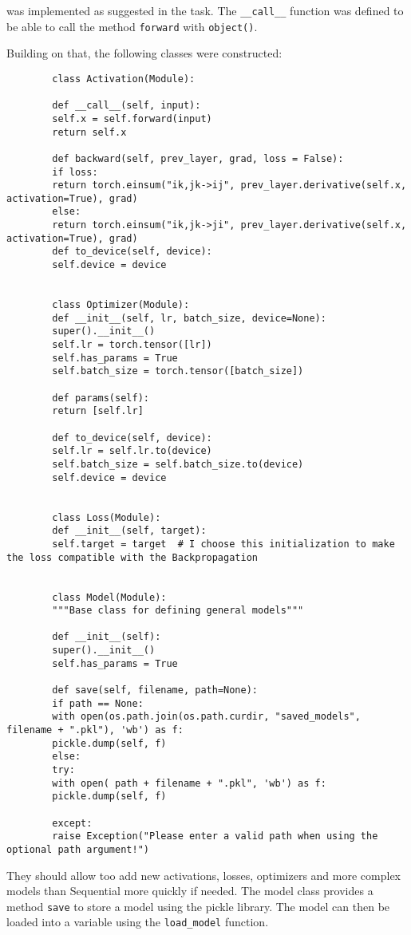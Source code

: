 \documentclass[11pt,english]{article}
\begin{document}
	was implemented as suggested in the task. The \lstinline|__call__| function was defined to be able to call the method \lstinline|forward| with \lstinline|object()|.
	
	Building on that, the following classes were constructed: 
	
	\begin{lstlisting}
		class Activation(Module):
		
		def __call__(self, input):
		self.x = self.forward(input)
		return self.x
		
		def backward(self, prev_layer, grad, loss = False):
		if loss:
		return torch.einsum("ik,jk->ij", prev_layer.derivative(self.x, activation=True), grad) 
		else:
		return torch.einsum("ik,jk->ji", prev_layer.derivative(self.x, activation=True), grad) 
		def to_device(self, device):
		self.device = device
		
		
		class Optimizer(Module):
		def __init__(self, lr, batch_size, device=None):
		super().__init__()
		self.lr = torch.tensor([lr])
		self.has_params = True
		self.batch_size = torch.tensor([batch_size])
		
		def params(self):
		return [self.lr]
		
		def to_device(self, device):
		self.lr = self.lr.to(device)
		self.batch_size = self.batch_size.to(device)
		self.device = device
	
	
		class Loss(Module):
		def __init__(self, target):
		self.target = target  # I choose this initialization to make the loss compatible with the Backpropagation 
	
	
		class Model(Module):
		"""Base class for defining general models"""
		
		def __init__(self):
		super().__init__()
		self.has_params = True
		
		def save(self, filename, path=None):
		if path == None:
		with open(os.path.join(os.path.curdir, "saved_models", filename + ".pkl"), 'wb') as f:
		pickle.dump(self, f)
		else:
		try:
		with open( path + filename + ".pkl", 'wb') as f:
		pickle.dump(self, f)
		
		except:
		raise Exception("Please enter a valid path when using the optional path argument!")
	\end{lstlisting}
	
	They should allow too add new activations, losses, optimizers and more complex models than Sequential more quickly if needed. The model class provides a method \lstinline|save| to store a model using the pickle library. The model can then be loaded into a variable using the \lstinline|load_model| function.
	
\end{document}
